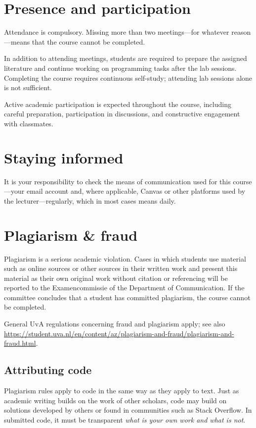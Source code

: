 \documentclass[a4paper,10pt,twocolumn]{report}
\begin{document}
\section{Presence and participation}

Attendance is compulsory. Missing more than two meetings---for whatever reason---means that the course cannot be completed.

In addition to attending meetings, students are required to prepare the assigned literature and continue working on programming tasks after the lab sessions. Completing the course requires continuous self-study; attending lab sessions alone is not sufficient.

Active academic participation is expected throughout the course, including careful preparation, participation in discussions, and constructive engagement with classmates. 

\section{Staying informed}

It is your responsibility to check the means of communication used for this course---your email account and, where applicable, Canvas or other platforms used by the lecturer---regularly, which in most cases means daily.

\section{Plagiarism \& fraud}

Plagiarism is a serious academic violation. Cases in which students use material such as online sources or other sources in their written work and present this material as their own original work without citation or referencing will be reported to the Examencommissie of the Department of Communication. If the committee concludes that a student has committed plagiarism, the course cannot be completed.

General UvA regulations concerning fraud and plagiarism apply; see also \url{https://student.uva.nl/en/content/az/plagiarism-and-fraud/plagiarism-and-fraud.html}.

\subsection{Attributing code}

Plagiarism rules apply to code in the same way as they apply to text. Just as academic writing builds on the work of other scholars, code may build on solutions developed by others or found in communities such as Stack Overflow. In submitted code, it must be transparent \emph{what is your own work and what is not}.
\end{document}
